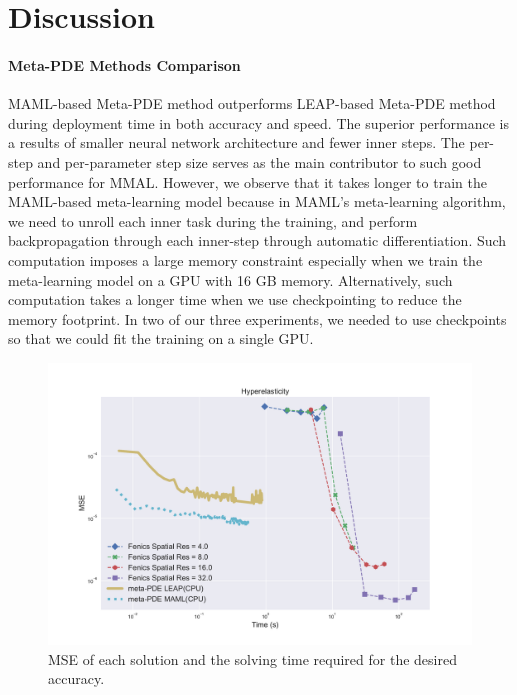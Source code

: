 \section{Discussion}
\paragraph{Meta-PDE Methods Comparison} MAML-based Meta-PDE method outperforms LEAP-based Meta-PDE method during deployment time in both accuracy and speed. The superior performance is a results of smaller neural network architecture and fewer inner steps. The per-step and per-parameter step size serves as the main contributor to such good performance for MMAL. However, we observe that it takes longer to train the MAML-based meta-learning model because in MAML's meta-learning algorithm, we need to unroll each inner task during the training, and perform backpropagation through each inner-step through automatic differentiation. Such computation imposes a large memory constraint especially when we train the meta-learning model on a GPU with 16 GB memory. Alternatively, such computation takes a longer time when we use checkpointing to reduce the memory footprint. In two of our three experiments, we needed to use checkpoints so that we could fit the training on a single GPU. 

\begin{figure}
  \centering
\includegraphics[width=\linewidth]{figures/hyperelasticity.pdf} 
\caption{MSE of each solution and the solving time required for the desired accuracy.}%
\label{fig:hyperelasricity_summary}%
\end{figure}

